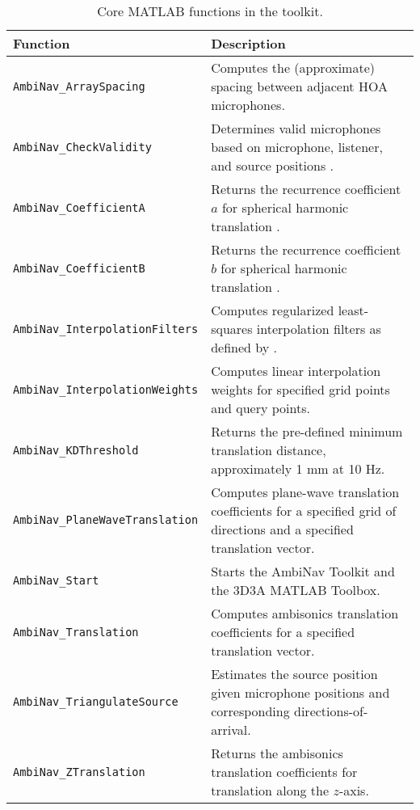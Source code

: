 \documentclass[11pt, oneside]{article}
\begin{document}
\begin{table}
\centering
  \begin{tabular}{| l | p{11cm} |}
    \hline
    \textbf{Function} & \textbf{Description} \\ \hline
    \texttt{AmbiNav\_ArraySpacing} & Computes the (approximate) spacing between adjacent HOA microphones. \\ \hline
    \texttt{AmbiNav\_CheckValidity} & Determines valid microphones based on microphone, listener, and source positions \citep[Sec.~3.3]{TylkaChoueiri2016}. \\ \hline
    \texttt{AmbiNav\_CoefficientA} & Returns the recurrence coefficient $a$ for spherical harmonic translation \citep[Eq.~(145)]{Zotter2009PhD}. \\ \hline
    \texttt{AmbiNav\_CoefficientB} & Returns the recurrence coefficient $b$ for spherical harmonic translation \citep[Eq.~(146)]{Zotter2009PhD}. \\ \hline
    \texttt{AmbiNav\_InterpolationFilters} & Computes regularized least-squares interpolation filters as defined by \citet{TylkaChoueiri2016}. \\ \hline
    \texttt{AmbiNav\_InterpolationWeights} & Computes linear interpolation weights for specified grid points and query points. \\ \hline
    \texttt{AmbiNav\_KDThreshold} & Returns the pre-defined minimum translation distance, approximately 1 mm at 10 Hz. \\ \hline
    \texttt{AmbiNav\_PlaneWaveTranslation} & Computes plane-wave translation coefficients for a specified grid of directions and a specified translation vector. \\ \hline
    \texttt{AmbiNav\_Start} & Starts the AmbiNav Toolkit and the 3D3A MATLAB Toolbox. \\ \hline
    \texttt{AmbiNav\_Translation} & Computes ambisonics translation coefficients for a specified translation vector. \\ \hline
    \texttt{AmbiNav\_TriangulateSource} & Estimates the source position given microphone positions and corresponding directions-of-arrival. \\ \hline
    \texttt{AmbiNav\_ZTranslation} & Returns the ambisonics translation coefficients for translation along the $z$-axis. \\ \hline
    \end{tabular}
    \caption{Core MATLAB functions in the toolkit.}
    \label{tab:Functions}
\end{table}
\end{document}
